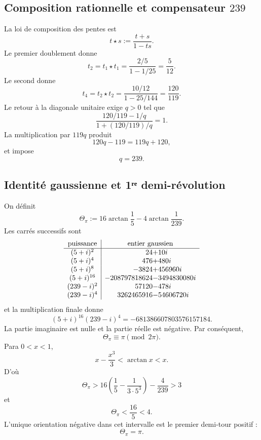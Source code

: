 \subsection{Composition rationnelle et compensateur \texorpdfstring{\(239\)}{239}}

La loi de composition des pentes est
\[
 t\star s:=\frac{t+s}{1-ts}.
\]
Le premier doublement donne
\[
 t_2=t_1\star t_1
 =\frac{2/5}{1-1/25}
 =\frac5{12}.
\]
Le second donne
\[
 t_4=t_2\star t_2
 =\frac{10/12}{1-25/144}
 =\frac{120}{119}.
\]
Le retour à la diagonale unitaire exige \(q>0\) tel que
\[
 \frac{120/119-1/q}{1+(120/119)/q}=1.
\]
La multiplication par \(119q\) produit
\[
 120q-119=119q+120,
\]
et impose
\begin{equation}
 \boxed{q=239.}
 \label{p12-83-c8-s1:eq:compensador-239-pi}
\end{equation}

\subsection{Identité gaussienne et 1ʳᵉ demi-révolution}

On définit
\begin{equation}
 \Theta_\pi
 :=16\arctan\frac15-4\arctan\frac1{239}.
 \label{p12-83-c8-s1:eq:theta-pi-autonoma}
\end{equation}
Les carrés successifs sont
\[
\begin{array}{c|r@{}l}
\text{puissance}&\multicolumn{2}{c}{\text{entier gaussien}}\\ \hline
(5+i)^2&24&+10i\\
(5+i)^4&476&+480i\\
(5+i)^8&-3824&+456960i\\
(5+i)^{16}&-208797818624&-3494830080i\\
(239-i)^2&57120&-478i\\
(239-i)^4&3262465916&-54606720i
\end{array}
\]
et la multiplication finale donne
\begin{equation}
 \boxed{
 (5+i)^{16}(239-i)^4
 =-681386607803576157184.}
 \label{p12-83-c8-s1:eq:identidad-gaussiana-pi-autonoma}
\end{equation}
La partie imaginaire est nulle et la partie réelle est négative. Par conséquent,
\[
 \Theta_\pi\equiv\pi\pmod{2\pi}.
\]
Para \(0<x<1\),
\[
 x-\frac{x^3}{3}<\arctan x<x.
\]
D’où
\[
 \Theta_\pi>
 16\left(\frac15-\frac1{3\cdot5^3}\right)-\frac4{239}>3
\]
et
\[
 \Theta_\pi<\frac{16}{5}<4.
\]
L’unique orientation négative dans cet intervalle est le premier demi-tour
positif :
\begin{equation}
 \boxed{\Theta_\pi=\pi.}
 \label{p12-83-c8-s1:eq:reconocimiento-pi-exacto}
\end{equation}

